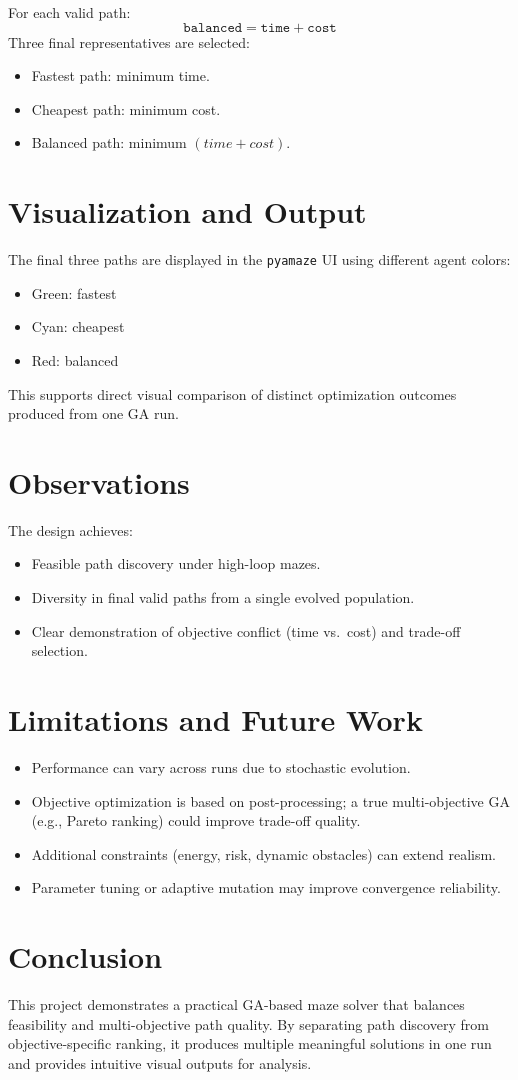 \documentclass[12pt]{article}
\begin{document}
For each valid path:
\[
\texttt{balanced} = \texttt{time} + \texttt{cost}
\]
Three final representatives are selected:
\begin{itemize}
    \item Fastest path: minimum time.
    \item Cheapest path: minimum cost.
    \item Balanced path: minimum \((time + cost)\).
\end{itemize}

\section{Visualization and Output}
The final three paths are displayed in the \texttt{pyamaze} UI using different agent colors:
\begin{itemize}
    \item Green: fastest
    \item Cyan: cheapest
    \item Red: balanced
\end{itemize}
This supports direct visual comparison of distinct optimization outcomes produced from one GA run.

\section{Observations}
The design achieves:
\begin{itemize}
    \item Feasible path discovery under high-loop mazes.
    \item Diversity in final valid paths from a single evolved population.
    \item Clear demonstration of objective conflict (time vs.\ cost) and trade-off selection.
\end{itemize}

\section{Limitations and Future Work}
\begin{itemize}
    \item Performance can vary across runs due to stochastic evolution.
    \item Objective optimization is based on post-processing; a true multi-objective GA (e.g., Pareto ranking) could improve trade-off quality.
    \item Additional constraints (energy, risk, dynamic obstacles) can extend realism.
    \item Parameter tuning or adaptive mutation may improve convergence reliability.
\end{itemize}

\section{Conclusion}
This project demonstrates a practical GA-based maze solver that balances feasibility and multi-objective path quality. By separating path discovery from objective-specific ranking, it produces multiple meaningful solutions in one run and provides intuitive visual outputs for analysis.
\end{document}
